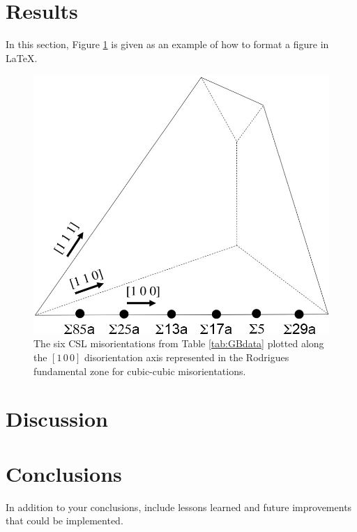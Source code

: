 \documentclass{article}
\begin{document}
\section{Results}
\label{sec:results}

In this section, Figure \ref{fig:Rodrigues} is given as an example of how to format a figure in \LaTeX{}.

\begin{figure}[htb]
    \centering
    \includegraphics[width=0.5\columnwidth]{Rodrigues}
    \caption{The six CSL misorientations from Table \ref{tab:GBdata} plotted along the $\left[1\,0\,0\right]$ disorientation axis represented in the Rodrigues fundamental zone for cubic-cubic misorientations.}
    \label{fig:Rodrigues}
\end{figure}

\section {Discussion}
\label{sec:discussion}


\section{Conclusions}
\label{conclusions}

In addition to your conclusions, include lessons learned and future improvements that could be implemented.




\printbibliography
\end{document}
